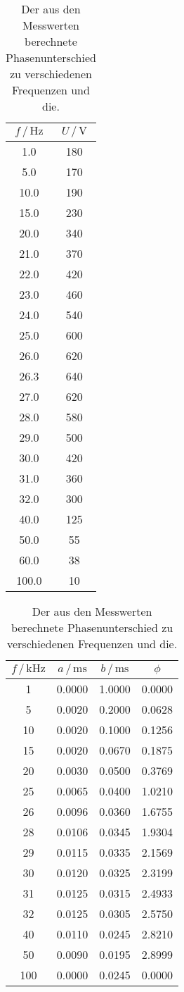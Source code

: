 \begin{table}
\centering
\caption{Der aus den Messwerten berechnete Phasenunterschied zu verschiedenen Frequenzen und die.}
\begin{tabular}[t]{cc|}
    \toprule
    $f \, / \, \si{\hertz}$ & $U \, / \, \si{\V}$\\
    \midrule
    1.0& 180    \\
    5.0& 170\\
    10.0& 190\\
    15.0& 230\\
    20.0& 340\\
    21.0& 370\\
    22.0& 420\\
    23.0& 460\\
    24.0& 540\\
    25.0& 600\\
    26.0& 620\\
    26.3& 640\\
    27.0& 620\\
    28.0& 580\\
    29.0& 500\\
    30.0& 420\\
    31.0& 360\\
    32.0& 300\\
    40.0& 125\\
    50.0& 55\\
    60.0& 38\\
    100.0& 10\\
    \bottomrule
\end{tabular}
\begin{tabular}[t]{|cccc}
    \toprule
    $f \,/\, \si{\kilo\hertz}$ & $a \,/\, \si{\milli\second}$ &  $b \,/\, \si{\milli\second}$ & $\phi$\\
    \midrule
    1& 0.0000& 1.0000& 0.0000\\
    5& 0.0020& 0.2000& 0.0628\\
    10& 0.0020& 0.1000&  0.1256\\
    15& 0.0020& 0.0670& 0.1875 \\
    20& 0.0030& 0.0500&  0.3769\\
    25& 0.0065& 0.0400&  1.0210\\
    26& 0.0096& 0.0360&  1.6755\\
    28& 0.0106& 0.0345& 1.9304 \\
    29& 0.0115& 0.0335& 2.1569\\
    30& 0.0120& 0.0325&  2.3199\\
    31& 0.0125& 0.0315 & 2.4933\\
    32& 0.0125& 0.0305& 2.5750\\
    40& 0.0110& 0.0245& 2.8210\\
    50& 0.0090& 0.0195& 2.8999\\
    100&0.0000& 0.0245& 0.0000\\
    \bottomrule
\end{tabular}
\label{tab:phase}
\end{table}
